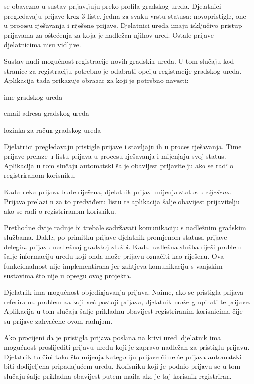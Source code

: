 		 se obavezno u sustav prijavljuju preko profila gradskog ureda. Djelatnici pregledavaju prijave kroz 3 liste, jedna za svaku vrstu statusa: novopristigle, one u procesu rješavanja i riješene prijave. Djelatnici ureda imaju isključivo pristup prijavama za oštećenja za koja je nadležan njihov ured. Ostale prijave djelatnicima nisu vidljive.
		
		Sustav nudi mogućnost registracije novih gradskih ureda. U tom slučaju kod stranice za registraciju potrebno je odabrati opciju registracije gradskog ureda. Aplikacija tada prikazuje obrazac za koji je potrebno navesti:
		\begin{packed_item} 
			\item ime gradskog ureda
			\item email adresa gradskog ureda
			\item lozinka za račun gradskog ureda
		\end{packed_item}
		
		Djelatnici pregledavaju pristigle prijave i stavljaju ih u proces rješavanja. Time prijave prelaze u listu prijava u procesu rješavanja i mijenjaju svoj status. Aplikacija u tom slučaju automatski šalje obavijest prijavitelju ako se radi o registriranom korisniku.
		
		Kada neka prijava bude riješena, djelatnik prijavi mijenja status u \textit{riješena}. Prijava prelazi u za to predviđenu listu te aplikacija šalje obavijest prijavitelju ako se radi o registriranom korisniku.
		
		Prethodne dvije radnje bi trebale sadržavati komunikaciju s nadležnim gradskim službama. Dakle, po primitku prijave djelatnik promjenom statusa prijave delegira prijavu nadležnoj gradskoj službi. Kada nadležna služba riješi problem šalje informaciju uredu koji onda može prijavu označiti kao riješenu. Ova funkcionalnost nije implementirana jer zahtjeva komunikaciju s vanjskim sustavima što nije u opsegu ovog projekta.
		
		Djelatnik ima mogućnost objedinjavanja prijava. Naime, ako se pristigla prijava referira na problem za koji već postoji prijava, djelatnik može grupirati te prijave. Aplikacija u tom slučaju šalje prikladnu obavijest registriranim korisnicima čije su prijave zahvaćene ovom radnjom.
		
		Ako procijeni da je pristigla prijava poslana na krivi ured, djelatnik ima mogućnost proslijediti prijavu uredu koji je zapravo nadležan za pristiglu prijavu. Djelatnik to čini tako što mijenja kategoriju prijave čime će prijava automatski biti dodijeljena pripadajućem uredu. Korisniku koji je podnio prijavu se u tom slučaju šalje prikladna obavijest putem maila ako je taj korisnik registriran.
		
